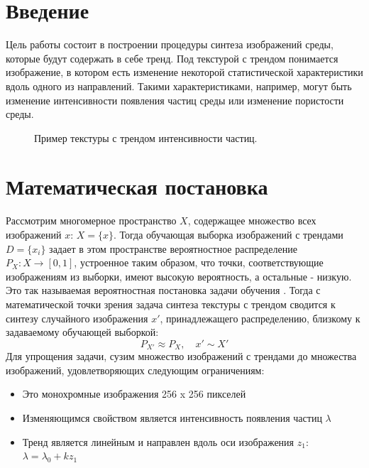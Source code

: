 \documentclass[a4paper]{article}
\begin{document}
	\section{Введение}
		Цель работы состоит в построении процедуры синтеза изображений среды, которые будут содержать в себе тренд. Под текстурой с трендом понимается изображение, в котором есть изменение некоторой статистической характеристики вдоль одного из направлений. Такими характеристиками, например, могут быть изменение интенсивности появления частиц среды или изменение пористости среды. \\
		\begin{figure}[h]
			\caption{Пример текстуры с трендом интенсивности частиц.}
			\label{trend-example}
		\end{figure}
	\section{Математическая постановка}
		Рассмотрим многомерное пространство $X$, содержащее множество всех изображений $x$: $X = \{x\}$. Тогда обучающая выборка изображений с трендами $D = \{x_i\}$ задает в этом пространстве вероятностное распределение $P_X : X \longrightarrow [0,1]$, устроенное таким образом, что точки, соответствующие изображениям из выборки, имеют высокую вероятность, а остальные - низкую. Это так называемая вероятностная постановка задачи обучения \cite{Voron-ML, GAN}. Тогда с математической точки зрения задача синтеза текстуры с трендом сводится к синтезу случайного изображения $x'$, принадлежащего распределению, близкому к задаваемому обучающей выборкой:
		$$ P_{X'} \approx P_X, \quad x' \sim X'$$
		Для упрощения задачи, сузим множество изображений с трендами до множества изображений, удовлетворяющих следующим ограничениям:
		\begin{itemize}
			\item Это монохромные изображения 256 x 256 пикселей
			\item Изменяющимся свойством является интенсивность появления частиц $\lambda$
			\item Тренд является линейным и направлен вдоль оси изображения $z_1$: 
			$ \lambda = \lambda_0 + k z_1 $
		\end{itemize}
\end{document}
